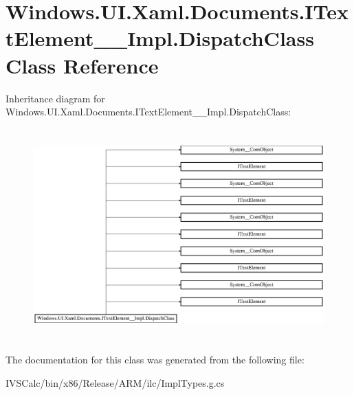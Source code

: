\hypertarget{class_windows_1_1_u_i_1_1_xaml_1_1_documents_1_1_i_text_element_____impl_1_1_dispatch_class}{}\section{Windows.\+U\+I.\+Xaml.\+Documents.\+I\+Text\+Element\+\_\+\+\_\+\+Impl.\+Dispatch\+Class Class Reference}
\label{class_windows_1_1_u_i_1_1_xaml_1_1_documents_1_1_i_text_element_____impl_1_1_dispatch_class}
Inheritance diagram for Windows.\+U\+I.\+Xaml.\+Documents.\+I\+Text\+Element\+\_\+\+\_\+\+Impl.\+Dispatch\+Class\+:\begin{figure}[H]
\begin{center}
\leavevmode
\includegraphics[height=8.169762cm]{class_windows_1_1_u_i_1_1_xaml_1_1_documents_1_1_i_text_element_____impl_1_1_dispatch_class}
\end{center}
\end{figure}


The documentation for this class was generated from the following file\+:\begin{DoxyCompactItemize}
\item 
I\+V\+S\+Calc/bin/x86/\+Release/\+A\+R\+M/ilc/Impl\+Types.\+g.\+cs\end{DoxyCompactItemize}
